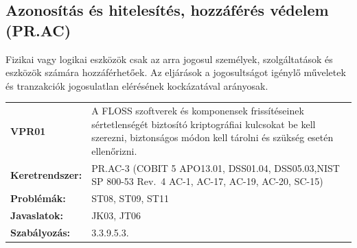 \documentclass[12pt,magyar,a4paper,oneside]{scrreprt}
\begin{document}
\hypertarget{azonosuxedtuxe1s-uxe9s-hitelesuxedtuxe9s-hozzuxe1fuxe9ruxe9s-vuxe9delem-pr.ac}{%
\subsection{Azonosítás és hitelesítés, hozzáférés védelem
(PR.AC)}\label{azonosuxedtuxe1s-uxe9s-hitelesuxedtuxe9s-hozzuxe1fuxe9ruxe9s-vuxe9delem-pr.ac}}

Fizikai vagy logikai eszközök csak az arra jogosul személyek,
szolgáltatások és eszközök számára hozzáférhetőek. Az eljárások a
jogosultságot igénylő műveletek és tranzakciók jogosulatlan elérésének
kockázatával arányosak.

\begin{longtable}[]{@{}ll@{}}
\toprule
\endhead
\begin{minipage}[t]{0.16\columnwidth}\raggedright
\textbf{VPR01}\strut
\end{minipage} & \begin{minipage}[t]{0.79\columnwidth}\raggedright
A FLOSS szoftverek és komponensek frissítéseinek sértetlenségét
biztosító kriptográfiai kulcsokat be kell szerezni, biztonságos módon
kell tárolni és szükség esetén ellenőrizni.\strut
\end{minipage}\tabularnewline
\begin{minipage}[t]{0.16\columnwidth}\raggedright
\textbf{Keretrendszer:}\strut
\end{minipage} & \begin{minipage}[t]{0.79\columnwidth}\raggedright
PR.AC-3 (COBIT 5 APO13.01, DSS01.04, DSS05.03,NIST SP 800-53 Rev.~4
AC-1, AC-17, AC-19, AC-20, SC-15)\strut
\end{minipage}\tabularnewline
\begin{minipage}[t]{0.16\columnwidth}\raggedright
\textbf{Problémák:}\strut
\end{minipage} & \begin{minipage}[t]{0.79\columnwidth}\raggedright
ST08, ST09, ST11\strut
\end{minipage}\tabularnewline
\begin{minipage}[t]{0.16\columnwidth}\raggedright
\textbf{Javaslatok:}\strut
\end{minipage} & \begin{minipage}[t]{0.79\columnwidth}\raggedright
JK03, JT06\strut
\end{minipage}\tabularnewline
\begin{minipage}[t]{0.16\columnwidth}\raggedright
\textbf{Szabályozás:}\strut
\end{minipage} & \begin{minipage}[t]{0.79\columnwidth}\raggedright
3.3.9.5.3.\strut
\end{minipage}\tabularnewline
\bottomrule
\end{longtable}
\end{document}
